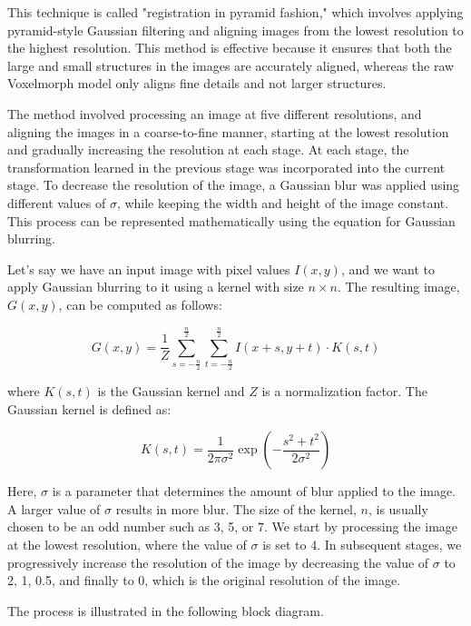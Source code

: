 \documentclass{report}
\begin{document}
	This technique is called "registration in pyramid fashion," which involves applying pyramid-style Gaussian filtering and aligning images from the lowest resolution to the highest resolution. This method is effective because it ensures that both the large and small structures in the images are accurately aligned, whereas the raw Voxelmorph model only aligns fine details and not larger structures.
		
	The method involved processing an image at five different resolutions, and aligning the images in a coarse-to-fine manner, starting at the lowest resolution and gradually increasing the resolution at each stage. At each stage, the transformation learned in the previous stage was incorporated into the current stage. To decrease the resolution of the image, a Gaussian blur was applied using different values of $\sigma$, while keeping the width and height of the image constant. This process can be represented mathematically using the equation for Gaussian blurring.
	
	Let's say we have an input image with pixel values $I(x, y)$, and we want to apply Gaussian blurring to it using a kernel with size $n \times n$. The resulting image, $G(x, y)$, can be computed as follows:
	
	\begin{equation}
		G(x, y) = \frac{1}{Z} \sum_{s=-\frac{n}{2}}^{\frac{n}{2}}\sum_{t=-\frac{n}{2}}^{\frac{n}{2}}I(x+s, y+t) \cdot K(s, t)
	\end{equation}
	
	where $K(s, t)$ is the Gaussian kernel and $Z$ is a normalization factor. The Gaussian kernel is defined as:
	
	\begin{equation}
		K(s, t) = \frac{1}{2\pi \sigma^2} \exp\left(-\frac{s^2+t^2}{2\sigma^2}\right)
	\end{equation}
	
	Here, $\sigma$ is a parameter that determines the amount of blur applied to the image. A larger value of $\sigma$ results in more blur. The size of the kernel, $n$, is usually chosen to be an odd number such as 3, 5, or 7. We start by processing the image at the lowest resolution, where the value of $\sigma$ is set to 4. In subsequent stages, we progressively increase the resolution of the image by decreasing the value of $\sigma$ to 2, 1, 0.5, and finally to 0, which is the original resolution of the image.
	
	The process is illustrated in the following block diagram.
	
\end{document}
